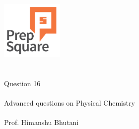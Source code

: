 \documentclass{beamer}
\begin{document}
\begin{center}
\ \\ \ \\
\includegraphics[width=30mm]{Logo-final.png} \\
\ \\ \ \\ 
{\huge Question 16 \\ \ \\ }
{\Large
Advanced questions on Physical Chemistry
}
{\large \ \\ \ \\ Prof. Himanshu Bhutani }
\end{center}
\end{document}
